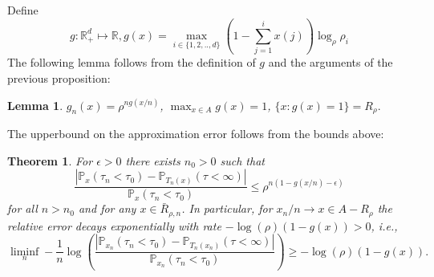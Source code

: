 \documentclass[11pt,a4paper]{article}
\newtheorem{theorem}{Theorem}[section]
\newtheorem{lemma}{Lemma}
\begin{document}
Define
\[
g: {\mathbb R}_+^d \mapsto {\mathbb R}, g(x) = \max_{i \in \{1,2,..,d\}}
(1-\sum_{j=1}^i x(j))\log_{\rho}\rho_i
\]
The following lemma follows from the definition of $g$ and the arguments
of the previous proposition:
\begin{lemma}\label{l:gnasg}
$g_n(x) = \rho^{ng(x/n)}$, 
$\max_{x \in A} g(x) =1$, $\{x: g(x) = 1 \} = R_\rho.$
\end{lemma}
The upperbound on the approximation error follows from the
bounds above:
\begin{theorem}\label{t:convergence}
 For  $\epsilon > 0$
there exists $n_0 > 0$ such that
\begin{equation}\label{e:mainrelativeerrorbound}
\frac{ |{\mathbb P}_{x}(\tau_n < \tau_0) - {\mathbb P}_{T_n(x)}(\tau < \infty)|}{ {\mathbb P}_{x}(\tau_n < \tau_0)} \le \rho^{n(1 - g(x/n)-\epsilon)}
\end{equation}
for all $n > n_0$ and for any $x \in \bar{R}_{\rho,n}$.
In particular, for $x_n/n \rightarrow x  \in A - R_\rho$ the relative error
decays exponentially with rate $-\log(\rho)(1-g(x))>0$, i.e.,
\begin{equation}\label{e:decayrate}
\liminf_n -\frac{1}{n} \log \left(
\frac{ |{\mathbb P}_{x_n}(\tau_n < \tau_0) - {\mathbb P}_{T_n(x_n)}(\tau < \infty)|}{ {\mathbb P}_{x_n}(\tau_n < \tau_0)} \right)
 \ge -\log(\rho)(1-g(x)).
\end{equation}
\end{theorem}
\end{document}
